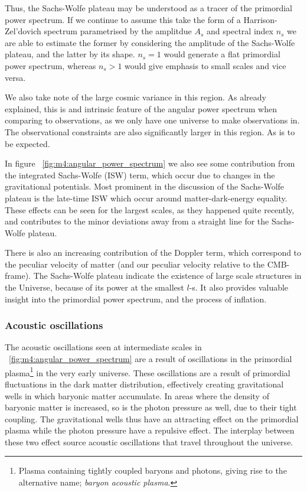         Thus, the Sachs-Wolfe plateau may be understood as a tracer of the primordial power spectrum. If we continue to assume this take the form of a Harrison-Zel'dovich spectrum parametrised by the amplitdue $A_s$ and spectral index $n_s$ we are able to estimate the former by considering the amplitude of the Sachs-Wolfe plateau, and the latter by its shape. $n_s=1$ would generate a flat primordial power spectrum, whereas $n_s>1$ would give emphasis to small scales and vice versa. 

        We also take note of the large cosmic variance in this region. As already explained, this is and intrinsic feature of the angular power spectrum when comparing to observations, as we only have one universe to make observations in. The observational constraints are also significantly larger in this region. As is to be expected. 

        In figure ~\cref{fig:m4:angular_power_spectrum} we also see some contribution from the integrated Sachs-Wolfe (ISW) term, which occur due to changes in the gravitational potentials. Most prominent in the discussion of the Sachs-Wolfe plateau is the late-time ISW which occur around matter-dark-energy equality. These effects can be seen for the largest scales, as they happened quite recently, and contributes to the minor deviations away from a straight line for the Sachs-Wolfe plateau.
        
        There is also an increasing contribution of the Doppler term, which correspond to the peculiar velocity of matter (and our peculiar velocity relative to the CMB-frame). The Sachs-Wolfe plateau indicate the existence of large scale structures in the Universe, because of its power at the smallest $l$-s. It also provides valuable insight into the primordial power spectrum, and the process of inflation. 

    \subsubsection{Acoustic oscillations}
        The acoustic oscillations seen at intermediate scales in ~\cref{fig:m4:angular_power_spectrum} are a result of oscillations in the primordial plasma\footnote{Plasma containing tightly coupled baryons and photons, giving rise to the alternative name; \textit{baryon acoustic plasma}.} in the very early universe. These oscillations are a result of primordial fluctuations in the dark matter distribution, effectively creating gravitational wells in which baryonic matter accumulate. In areas where the density of baryonic matter is increased, so is the photon pressure as well, due to their tight coupling. The gravitational wells thus have an attracting effect on the primordial plasma while the photon pressure have a repulsive effect. The interplay between these two effect source acoustic oscillations that travel throughout the universe. 

